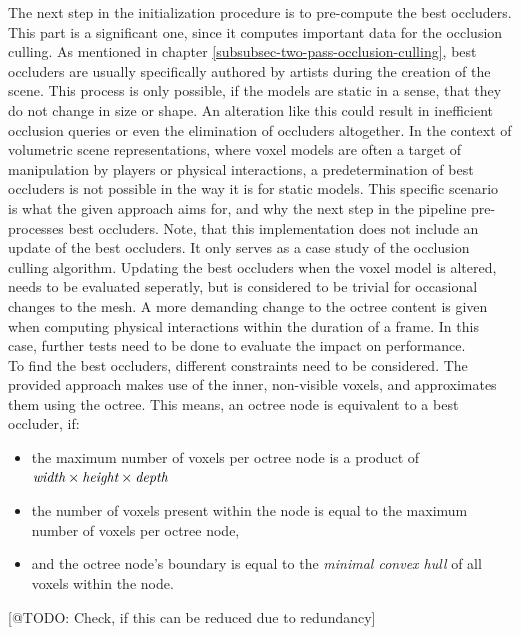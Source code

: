The next step in the initialization procedure is to pre-compute the best occluders. This part is a significant one, 
since it computes important data for the occlusion culling. As mentioned in chapter \ref{subsubsec-two-pass-occlusion-culling},
best occluders are usually specifically authored by artists during the creation of the scene. This process is only 
possible, if the models are static in a sense, that they do not change in size or shape. An alteration like this 
could result in inefficient occlusion queries or even the elimination of occluders altogether. In the context of 
volumetric scene representations, where voxel models are often a target of manipulation by players or physical 
interactions, a predetermination of best occluders is not possible in the way it is for static models.
This specific scenario is what the given approach aims for, and why the next step in the pipeline pre-processes best 
occluders. Note, that this implementation does not include an update of the best occluders. It only serves as a 
case study of the occlusion culling algorithm. Updating the best occluders when the voxel model is altered, 
needs to be evaluated seperatly, but is considered to be trivial for occasional changes to the mesh. A more 
demanding change to the octree content is given when computing physical interactions within the duration of a frame.
In this case, further tests need to be done to evaluate the impact on performance. \\

\noindent
To find the best occluders, different constraints need to be considered. The provided approach makes use of the inner, 
non-visible voxels, and approximates them using the octree. This means, an octree node is equivalent to a best occluder, 
if:

\begin{itemize}
    \item the maximum number of voxels per octree node is a product of \begin{math}\emph{width} \times \emph{height} \times \emph{depth}\end{math}
    \item the number of voxels present within the node is equal to the maximum number of voxels per octree node,
    \item and the octree node's boundary is equal to the \emph{minimal convex hull} of all voxels within the node.
\end{itemize}

[@TODO: Check, if this can be reduced due to redundancy]

